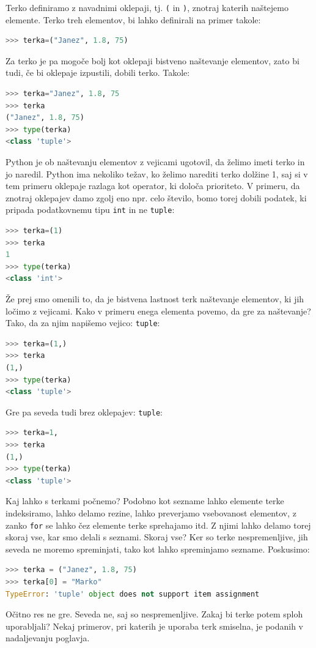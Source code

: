Terko definiramo z navadnimi oklepaji, tj. \texttt{(} in \texttt{)}, znotraj katerih naštejemo elemente. Terko treh elementov, bi lahko definirali na primer takole:
\begin{lstlisting}[language=Python, showstringspaces=false]
>>> terka=("Janez", 1.8, 75)
\end{lstlisting}
Za terko je pa mogoče bolj kot oklepaji bistveno naštevanje elementov, zato bi tudi, če bi oklepaje izpustili, dobili terko. Takole:
\begin{lstlisting}[language=Python, showstringspaces=false]
>>> terka="Janez", 1.8, 75
>>> terka
("Janez", 1.8, 75)
>>> type(terka)
<class 'tuple'>
\end{lstlisting}
Python je ob naštevanju elementov z vejicami ugotovil, da želimo imeti terko in jo naredil. Python ima nekoliko težav, ko želimo narediti terko dolžine 1, saj si v tem primeru oklepaje razlaga kot operator, ki določa prioriteto. V primeru, da znotraj oklepajev damo zgolj eno npr. celo število, bomo torej dobili podatek, ki pripada podatkovnemu tipu \texttt{int} in ne \texttt{tuple}:
\begin{lstlisting}[language=Python, showstringspaces=false]
>>> terka=(1)
>>> terka
1
>>> type(terka)
<class 'int'>
\end{lstlisting}
Že prej smo omenili to, da je bistvena lastnost terk naštevanje elementov, ki jih ločimo z vejicami. Kako v primeru enega elementa povemo, da gre za naštevanje? Tako, da za njim napišemo vejico:
\texttt{tuple}:
\begin{lstlisting}[language=Python, showstringspaces=false]
>>> terka=(1,)
>>> terka
(1,)
>>> type(terka)
<class 'tuple'>
\end{lstlisting}
Gre pa seveda tudi brez oklepajev:
\texttt{tuple}:
\begin{lstlisting}[language=Python, showstringspaces=false]
>>> terka=1,
>>> terka
(1,)
>>> type(terka)
<class 'tuple'>
\end{lstlisting}

Kaj lahko s terkami počnemo? Podobno kot sezname lahko elemente terke indeksiramo, lahko delamo rezine, lahko preverjamo vsebovanost elementov, z zanko \texttt{for} se lahko čez elemente terke sprehajamo itd. Z njimi lahko delamo torej skoraj vse, kar smo delali s seznami. Skoraj vse? Ker so terke nespremenljive, jih seveda ne moremo spreminjati, tako kot lahko spreminjamo sezname. Poskusimo:
\begin{lstlisting}[language=Python, showstringspaces=false]
>>> terka = ("Janez", 1.8, 75)
>>> terka[0] = "Marko"
TypeError: 'tuple' object does not support item assignment
\end{lstlisting}
Očitno res ne gre. Seveda ne, saj so nespremenljive. Zakaj bi terke potem sploh uporabljali? Nekaj primerov, pri katerih je uporaba terk smiselna, je podanih v nadaljevanju poglavja.

